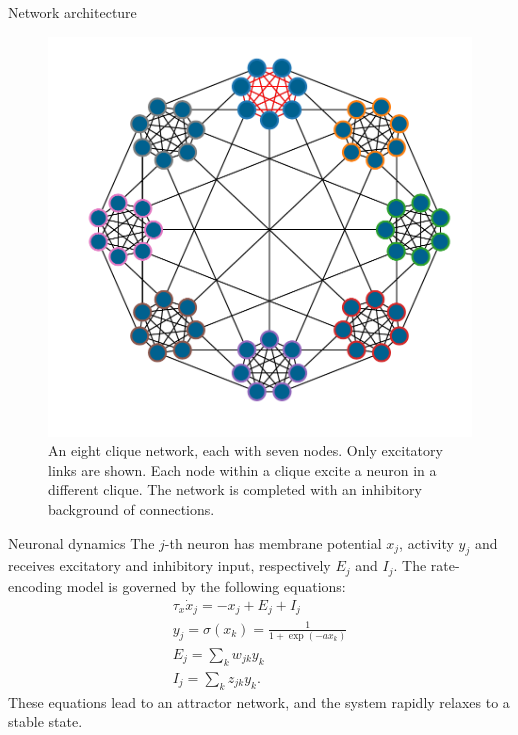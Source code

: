 \documentclass[final,hyperref={pdfpagelabels=false}]{beamer}
\begin{document}
\begin{frame}
\begin{columns}
\begin{column}{.30\textwidth}
\begin{minipage}[T]{.95\textwidth}
{\begin{block}{Network architecture}
			
			\begin{figure}
				\centering
				\includegraphics[width=.7\linewidth]{network2.pdf}
				\caption{An eight clique network, each with seven nodes. Only excitatory links are shown. Each node within a clique excite a neuron in a different clique. The network is completed with an inhibitory background of connections.}
				\label{fig:network}
			\end{figure}
			\end{block}		
							
			\vfill
			\begin{block}{Neuronal dynamics}
	 		The $j$-th neuron has membrane potential $x_j$, activity $y_j$ and receives excitatory and inhibitory input, respectively $E_j$ and $I_j$. The rate-encoding model is governed by the following equations:
			\begin{gather*}
				\tau_x \dot{x}_j = -x_j + E_j + I_j\\
				y_j = \sigma \left(x_k\right) = \frac{1}{1+\exp \left(-a x_k \right) } \\
				E_j = \sum_{k} w_{jk} y_k \\
				I_j = \sum_k z_{jk} y_k.
				\label{eq:neuron}
			\end{gather*}
			These equations lead to an attractor network, and the system rapidly relaxes to a stable state.
			

\end{block}}
\end{minipage}
\end{column}
\end{columns}
\end{frame}
\end{document}

